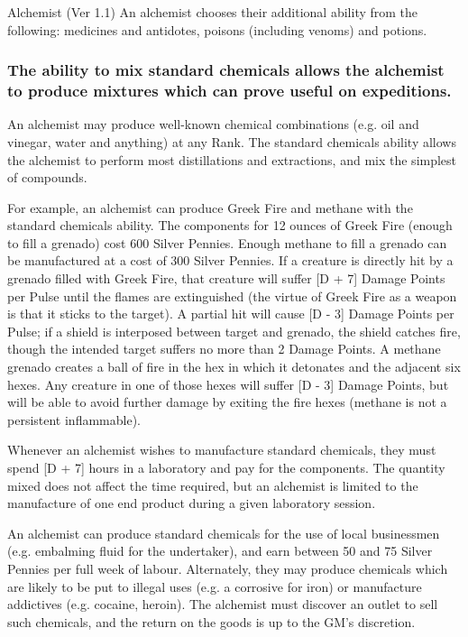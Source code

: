 \begin{Chapter}{Alchemist (Ver 1.1)}
An alchemist chooses their additional ability from the following:
medicines and antidotes, poisons (including venoms) and potions.

\subsubsection{The ability to mix standard chemicals allows the alchemist to produce
mixtures which can prove useful on expeditions.}

An alchemist may produce well-known chemical combinations (e.g. oil
and vinegar, water and anything) at any Rank. The standard chemicals
ability allows the alchemist to perform most distillations and
extractions, and mix the simplest of compounds.

For example, an alchemist can produce Greek Fire and methane with the
standard chemicals ability.  The components for 12 ounces of Greek
Fire (enough to fill a grenado) cost 600 Silver Pennies.  Enough
methane to fill a grenado can be manufactured at a cost of 300 Silver
Pennies. If a creature is directly hit by a grenado filled with Greek
Fire, that creature will suffer [D + 7] Damage Points per Pulse until
the flames are extinguished (the virtue of Greek Fire as a weapon is
that it sticks to the target).  A partial hit will cause [D - 3]
Damage Points per Pulse; if a shield is interposed between target and
grenado, the shield catches fire, though the intended target suffers
no more than 2 Damage Points. A methane grenado creates a ball of fire
in the hex in which it detonates and the adjacent six hexes.  Any
creature in one of those hexes will suffer [D - 3] Damage Points, but
will be able to avoid further damage by exiting the fire hexes
(methane is not a persistent inflammable).

Whenever an alchemist wishes to manufacture standard chemicals, they
must spend [D + 7] hours in a laboratory and pay for the components.
The quantity mixed does not affect the time required, but an alchemist
is limited to the manufacture of one end product during a given
laboratory session.

An alchemist can produce standard chemicals for the use of local
businessmen (e.g. embalming fluid for the undertaker), and earn
between 50 and 75 Silver Pennies per full week of labour. Alternately,
they may produce chemicals which are likely to be put to illegal uses
(e.g.  a corrosive for iron) or manufacture addictives (e.g.  cocaine,
heroin).  The alchemist must discover an outlet to sell such
chemicals, and the return on the goods is up to the GM’s discretion.


\end{Chapter}
